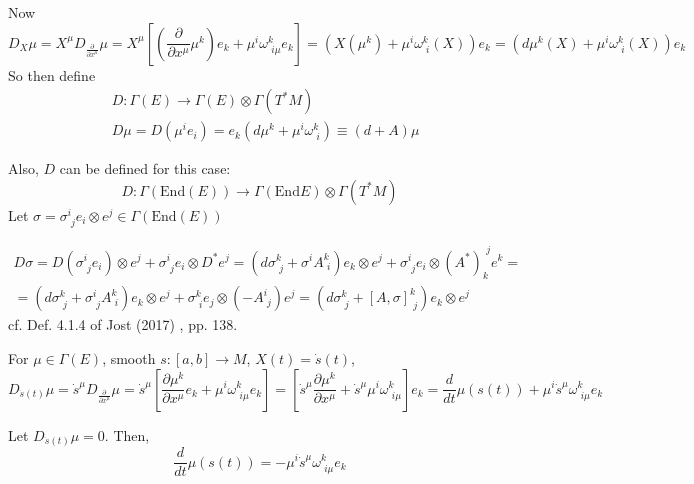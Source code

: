 Now
\[
D_X\mu = X^{\mu} D_{\frac{\partial }{ \partial x^{\mu}}}\mu = X^{\mu} \left[ \left( \frac{ \partial }{ \partial x^{\mu}} \mu^k \right) e_k + \mu^i \omega^k_{ \,\, i\mu} e_k \right] = \left( X(\mu^k) + \mu^i \omega^k_{ \,\, i}(X) \right) e_k = \left( d\mu^k(X) + \mu^i \omega^k_{ \,\, i}(X) \right) e_k
\]
So then define 
\begin{equation}
	\begin{aligned}
		& D: \Gamma(E) \to \Gamma(E) \otimes \Gamma(T^*M) \\
	& D\mu  = D(\mu^i e_i) = e_k ( d\mu^k +\mu^i \omega^k_{ \,\, i}) \equiv (d+A)\mu
	\end{aligned}
\end{equation}

Also, $D$ can be defined for this case:
\[
D: \Gamma (\text{End}(E)) \to \Gamma(\text{End}E) \otimes \Gamma(T^*M)
\]
Let $\sigma = \sigma^i_{ \,\, j} e_i \otimes e^j \in \Gamma(\text{End}(E))$

\begin{equation}
\begin{gathered}
	D\sigma = D(\sigma^i_{ \,\, j} e_i ) \otimes e^j + \sigma^i_{ \,\, j} e_i \otimes D^* e^j = \left( d\sigma^k_{ \,\, j} + \sigma^i A^k_{ \,\, i} \right) e_k \otimes e^j + \sigma^i_{ \,\, j} e_i \otimes (A^*)_k^{ \,\, j} e^k = \\
	= (d\sigma^k_{ \,\, j} + \sigma^i_{ \,\, j} A^k_{ \,\, i} ) e_k \otimes e^j + \sigma^k_{ \,\, i} e_j \otimes (- A^i_{ \, \, j}) e^j = (d\sigma^k_{ \,\, j} + [A,\sigma]^k_{ \,\, j}) e_k\otimes e^j
\end{gathered}
\end{equation}
cf. Def. 4.1.4 of Jost (2017) \cite{dgdt:Jost2017}, pp. 138.  

For $\mu \in \Gamma(E)$, smooth $s:[a,b] \to M$, $X(t) = \dot{s}(t)$,
\begin{equation}
D_{\dot{s}(t)}\mu = \dot{s}^{\mu}D_{\frac{ \partial }{ \partial x^{\mu}} } \mu = \dot{s}^{\mu} \left[ \frac{ \partial \mu^k }{ \partial x^{\mu}} e_k + \mu^i \omega^k_{ \, \, i\mu} e_k \right] = \left[ \dot{s}^{\mu} \frac{ \partial \mu^k}{ \partial x^{\mu} } + \dot{s}^{\mu} \mu^i \omega^k_{ \,\, i \mu} \right] e_k =\frac{d}{dt} \mu(s(t)) + \mu^i \dot{s}^{\mu} \omega^k_{ \,\, i \mu} e_k
\end{equation}

Let $D_{\dot{s}(t)}\mu=0$.  Then, 
\begin{equation}
\frac{d}{dt} \mu(s(t)) = -\mu^i \dot{s}^{\mu}\omega^k_{ \,\, i\mu} e_k
\end{equation}


